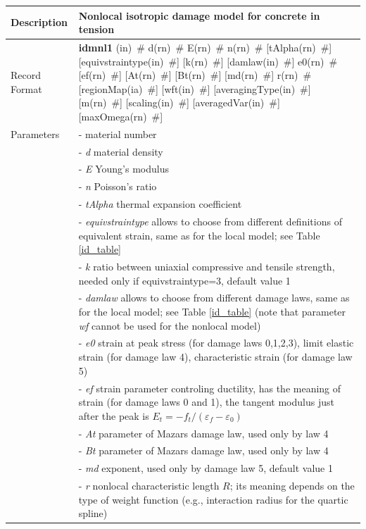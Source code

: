 \documentclass[a4paper]{article}
\newcommand{\descitem}[1]{{\noindent \bf #1}}
\newcommand{\elemparam}[2]{{{#1\tiny (#2)}~\#}}
\newcommand{\param}[1]{{\it #1}}
\begin{document}
\begin{table}[!htb]
\begin{tabular}{|l|p{9cm}|}
\hline
Description & Nonlocal isotropic damage model for concrete in tension\\
\hline
Record Format & \descitem{idmnl1} 
\elemparam{}{in} 
\elemparam{d}{rn} 
\elemparam{E}{rn}
\elemparam{n}{rn}  
[\elemparam{tAlpha}{rn}]
[\elemparam{equivstraintype}{in}] 
[\elemparam{k}{rn}] 
[\elemparam{damlaw}{in}] 
\elemparam{e0}{rn}
[\elemparam{ef}{rn}] 
[\elemparam{At}{rn}] 
[\elemparam{Bt}{rn}] 
[\elemparam{md}{rn}] 
\elemparam{r}{rn}
[\elemparam{regionMap}{ia}]
[\elemparam{wft}{in}]
[\elemparam{averagingType}{in}]
[\elemparam{m}{rn}]
[\elemparam{scaling}{in}]
[\elemparam{averagedVar}{in}]
[\elemparam{maxOmega}{rn}]\\
Parameters &- \param{} material number\\
&- \param{d} material density\\
&- \param{E} Young's modulus\\
&- \param{n} Poisson's ratio\\
&- \param{tAlpha} thermal expansion coefficient\\
&- \param{equivstraintype} allows to choose from different definitions
of equivalent strain, same as for the local model; see Table \ref{id_table}\\
&- \param{k} ratio between uniaxial compressive and tensile strength, needed only if equivstraintype=3, default value 1\\
&- \param{damlaw} allows to choose from different damage laws, 
same as for the local model; see Table \ref{id_table}
(note that parameter {\it wf} cannot be used for the nonlocal model)\\
&- \param{e0} strain at peak stress (for damage laws 0,1,2,3), limit elastic strain (for damage law 4), characteristic strain (for damage law 5)\\
&- \param{ef} strain parameter controling ductility, has the meaning of strain (for damage laws 0 and 1), the tangent modulus just after the peak is
$E_t=-f_t/(\varepsilon_f-\varepsilon_0)$\\
&- \param{At} parameter of Mazars damage law, used only by law 4\\
&- \param{Bt} parameter of Mazars damage law, used only by law 4\\
&- \param{md} exponent, used only by damage law 5, default value 1\\
&- \param{r} nonlocal characteristic length $R$; its meaning depends
on the type of weight function (e.g., interaction radius for the quartic spline)\\

\end{tabular}
\end{table}
\end{document}
